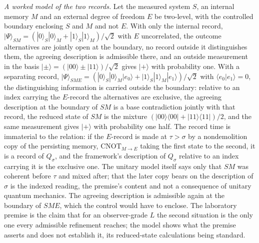 \emph{A worked model of the two records.} Let the measured system $S$, an internal memory $M$ and an external degree of freedom $E$ be two-level, with the controlled boundary enclosing $S$ and $M$ and not $E$. With only the internal record, $|\Psi\rangle_{SM} = (|0\rangle_S|0\rangle_M + |1\rangle_S|1\rangle_M)/\sqrt2$ with $E$ uncorrelated, the outcome alternatives are jointly open at the boundary, no record outside it distinguishes them, the agreeing description is admissible there, and an outside measurement in the basis $|\pm\rangle = (|00\rangle \pm |11\rangle)/\sqrt2$ gives $|+\rangle$ with probability one. With a separating record, $|\Psi\rangle_{SME} = (|0\rangle_S|0\rangle_M|e_0\rangle + |1\rangle_S|1\rangle_M|e_1\rangle)/\sqrt2$ with $\langle e_0 | e_1\rangle = 0$, the distinguishing information is carried outside the boundary: relative to an index carrying the $E$-record the alternatives are exclusive, the agreeing description at the boundary of $SM$ is a base contradiction jointly with that record, the reduced state of $SM$ is the mixture $(|00\rangle\langle 00| + |11\rangle\langle 11|)/2$, and the same measurement gives $|+\rangle$ with probability one half. The record time is immaterial to the relation: if the $E$-record is made at $\tau > \sigma$ by a nondemolition copy of the persisting memory, $\mathrm{CNOT}_{M \to E}$ taking the first state to the second, it is a record of $Q_\sigma$, and the framework's description of $Q_\sigma$ relative to an index carrying it is the exclusive one. The unitary model itself says only that $SM$ was coherent before $\tau$ and mixed after; that the later copy bears on the description of $\sigma$ is the indexed reading, the premise's content and not a consequence of unitary quantum mechanics. The agreeing description is admissible again at the boundary of $SME$, which the control would have to enclose. The laboratory premise is the claim that for an observer-grade $L$ the second situation is the only one every admissible refinement reaches; the model shows what the premise asserts and does not establish it, its reduced-state calculations being standard.


